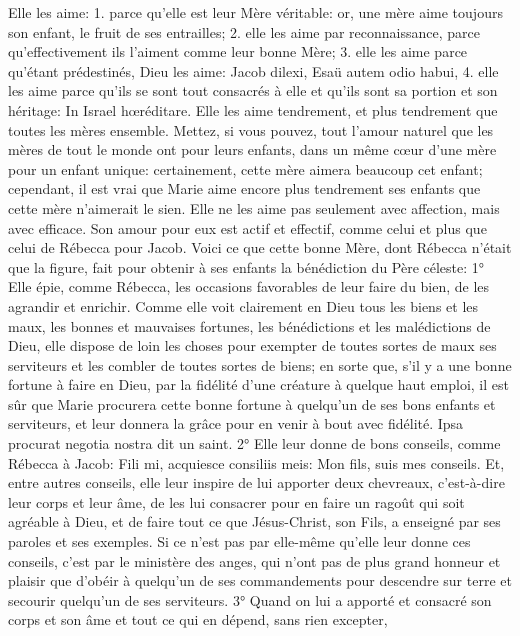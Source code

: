 Elle les aime: 1. parce qu'elle est leur Mère véritable: or, une mère aime toujours son enfant, le fruit de ses
entrailles; 2. elle les aime par reconnaissance, parce qu'effectivement ils l'aiment comme leur bonne Mère; 3. elle
les aime parce qu'étant prédestinés, Dieu les aime: Jacob dilexi, Esaü autem odio habui, 4. elle les aime parce
qu'ils se sont tout consacrés à elle et qu'ils sont sa portion et son héritage: In Israel hœréditare.
 Elle les aime tendrement, et plus tendrement que toutes les mères ensemble. Mettez, si vous pouvez, tout
l'amour naturel que les mères de tout le monde ont pour leurs enfants, dans un même cœur d'une mère pour un
enfant unique: certainement, cette mère aimera beaucoup cet enfant; cependant, il est vrai que Marie aime encore
plus tendrement ses enfants que cette mère n'aimerait le sien.
Elle ne les aime pas seulement avec affection, mais avec efficace. Son amour pour eux est actif et effectif, comme
celui et plus que celui de Rébecca pour Jacob. Voici ce que cette bonne Mère, dont Rébecca n'était que la figure,
fait pour obtenir à ses enfants la bénédiction du Père céleste:
 1° Elle épie, comme Rébecca, les occasions favorables de leur faire du bien, de les agrandir et enrichir.
Comme elle voit clairement en Dieu tous les biens et les maux, les bonnes et mauvaises fortunes, les bénédictions
et les malédictions de Dieu, elle dispose de loin les choses pour exempter de toutes sortes de maux ses serviteurs
et les combler de toutes sortes de biens; en sorte que, s'il y a une bonne fortune à faire en Dieu, par la fidélité
d'une créature à quelque haut emploi, il est sûr que Marie procurera cette bonne fortune à quelqu'un de ses bons
enfants et serviteurs, et leur donnera la grâce pour en venir à bout avec fidélité. Ipsa procurat negotia nostra dit un
saint.
 2° Elle leur donne de bons conseils, comme Rébecca à Jacob: Fili mi, acquiesce consiliis meis: Mon fils, suis
mes conseils. Et, entre autres conseils, elle leur inspire de lui apporter deux chevreaux, c'est-à-dire leur corps et
leur âme, de les lui consacrer pour en faire un ragoût qui soit agréable à Dieu, et de faire tout ce que Jésus-Christ,
son Fils, a enseigné par ses paroles et ses exemples. Si ce n'est pas par elle-même qu'elle leur donne ces
conseils, c'est par le ministère des anges, qui n'ont pas de plus grand honneur et plaisir que d'obéir à quelqu'un de
ses commandements pour descendre sur terre et secourir quelqu'un de ses serviteurs.
 3° Quand on lui a apporté et consacré son corps et son âme et tout ce qui en dépend, sans rien excepter,
